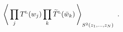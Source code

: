 \begin{equation}
\label{badnotation}
\left\langle\, \prod_j T^{\rm \scriptscriptstyle L}(w_j)
\prod_k \widetilde T^{\rm \scriptscriptstyle L}(\bar w_k)
\,\right\rangle_{S^2(z_1,\dots,z_N)} \ .
\end{equation}


